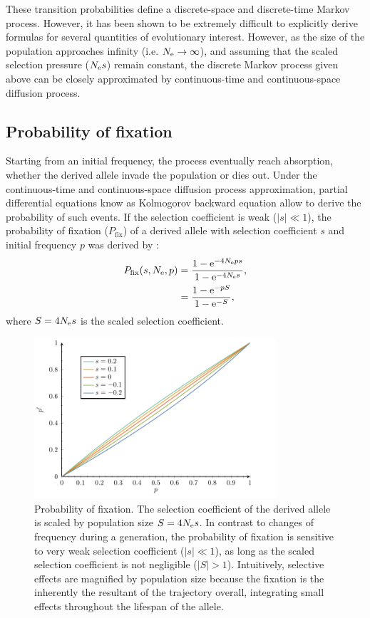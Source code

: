 These {transition} probabilities define a discrete-space and discrete-time Markov process.
However, it has been shown to be extremely difficult to explicitly derive formulas for several quantities of evolutionary interest.
However, as the size of the population approaches infinity (i.e. $ N_{\textrm{e}} \to \infty$), and assuming that the scaled selection pressure ($N_{\textrm{e}} s $) remain constant, the discrete Markov process given above can be closely approximated by continuous-time and continuous-space diffusion process.\\

\subsection{Probability of fixation}
Starting from an initial frequency, the process eventually reach absorption, whether the derived \gls{allele} invade the population or dies out. 
Under the continuous-time and continuous-space diffusion process approximation, partial differential equations know as Kolmogorov backward equation allow to derive the probability of such events. 
If the selection coefficient is weak ($|s| \ll 1$), the probability of fixation ($P_{\mathrm{fix}}$) of a derived \gls{allele} with selection coefficient $s$ and initial frequency $p$ was derived by \citet{Kimura1962}:
\begin{align}
P_{\mathrm{fix}}(s, N_{\textrm{e}}, p) & = \dfrac{1 - \mathrm{e}^{-4 N_{\textrm{e}} p s }}{1 - \mathrm{e}^{-4 N_{\textrm{e}} s}},\\
			     & = \dfrac{1 - \mathrm{e}^{- p S }}{1 - \mathrm{e}^{-S}},
\end{align}
where $S = 4 N_{\textrm{e}} s$ is the scaled selection coefficient.
\begin{figure}[H]
	\begin{center}
		\includegraphics[width=0.8\textwidth, page=3] {figures.pdf}
	\end{center}
	\caption[Probability of fixation]{Probability of fixation. The selection coefficient of the derived \gls{allele} is scaled by population size $S=4 N_{\textrm{e}} s$. In contrast to changes of frequency during a generation, the probability of fixation is sensitive to very weak selection coefficient ($|s| \ll 1$), as long as the scaled selection coefficient is not negligible ($|S| > 1$). Intuitively, selective effects are magnified by population size because the fixation is the inherently the resultant of the trajectory overall, integrating small effects throughout the lifespan of the \gls{allele}. }
\end{figure}

